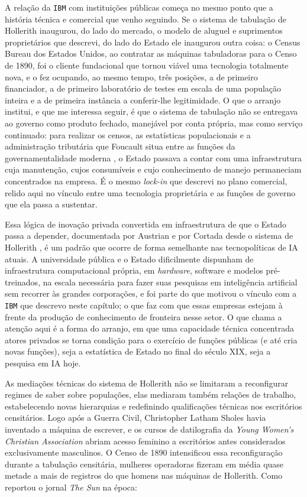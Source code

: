 A relação da \texttt{IBM} com instituições públicas começa no mesmo ponto que a história técnica e comercial que venho seguindo. Se o sistema de tabulação de Hollerith inaugurou, do lado do mercado, o modelo de aluguel e suprimentos proprietários que descrevi, do lado do Estado ele inaugurou outra coisa: o Census Bureau dos Estados Unidos, ao contratar as máquinas tabuladoras para o Censo de 1890, foi o cliente fundacional que tornou viável uma tecnologia totalmente nova, e o fez ocupando, ao mesmo tempo, três posições, a de primeiro financiador, a de primeiro laboratório de testes em escala de uma população inteira e a de primeira instância a conferir-lhe legitimidade. O que o arranjo institui, e que me interessa seguir, é que o sistema de tabulação não se entregava ao governo como produto fechado, manejável por conta própria, mas como serviço continuado: para realizar os censos, as estatísticas populacionais e a administração tributária que Foucault situa entre as funções da governamentalidade moderna \parencite{Foucault2008Seguranca}, o Estado passava a contar com uma infraestrutura cuja manutenção, cujos consumíveis e cujo conhecimento de manejo permaneciam concentrados na empresa. É o mesmo \textit{lock-in} que descrevi no plano comercial, relido aqui no vínculo entre uma tecnologia proprietária e as funções de governo que ela passa a sustentar.

Essa lógica de inovação privada convertida em infraestrutura de que o Estado passa a depender, documentada por Austrian e por Cortada desde o sistema de Hollerith \parencite{Austrian1982Hollerith, Cortada2019IBM}, é um padrão que ocorre de forma semelhante nas tecnopolíticas de IA atuais. A universidade pública e o Estado dificilmente dispunham de infraestrutura computacional própria, em \textit{hardware}, software e modelos pré-treinados, na escala necessária para fazer suas pesquisas em inteligência artificial sem recorrer às grandes corporações, e foi parte do que motivou o vínculo com a \texttt{IBM} que descrevo neste capítulo; o que faz com que essas empresas estejam à frente da produção de conhecimento de fronteira nesse setor. O que chama a atenção aqui é a forma do arranjo, em que uma capacidade técnica concentrada atores privados se torna condição para o exercício de funções públicas (e até cria novas funções), seja a estatística de Estado no final do século XIX, seja a pesquisa em IA hoje.

As mediações técnicas do sistema de Hollerith não se limitaram a reconfigurar regimes de saber sobre populações, elas mediaram também relações de trabalho, estabelecendo novas hierarquias e redefinindo qualificações técnicas nos escritórios censitários. Logo após a Guerra Civil, Christopher Latham Sholes havia inventado a máquina de escrever, e os cursos de datilografia da \textit{Young Women's Christian Association} abriam acesso feminino a escritórios antes considerados exclusivamente masculinos. O Censo de 1890 intensificou essa reconfiguração durante a tabulação censitária, mulheres operadoras fizeram em média quase metade a mais de registros do que homens nas máquinas de Hollerith. Como reportou o jornal \textit{The Sun} na época:

